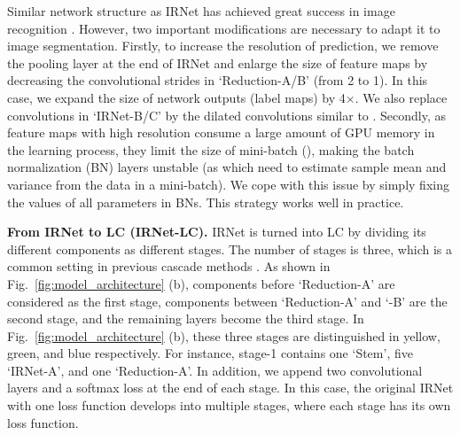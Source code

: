 \documentclass[10pt,twocolumn,letterpaper]{article}
\begin{document}
Similar network structure as IRNet has achieved great success in image recognition \cite{szegedy2016inception}.
However, two important modifications are necessary to adapt it to image segmentation.
Firstly, to increase the resolution of prediction, we remove the pooling layer at the end of IRNet and enlarge the size of feature maps by decreasing the convolutional strides in `Reduction-A/B' (from 2 to 1).
In this case, we expand the size of network outputs (label maps) by 4$\times$.
We also replace convolutions in `IRNet-B/C' by the dilated convolutions similar to \cite{chen2014semantic}.
Secondly, as feature maps with high resolution consume a large amount of GPU memory in the learning process, they limit the size of mini-batch (), making the batch normalization (BN) layers \cite{ioffe2015batch} unstable (as which need to estimate sample mean and variance from the data in a mini-batch).
We cope with this issue by simply fixing the values of all parameters in BNs.
This strategy works well in practice.









\noindent
\textbf{From IRNet to LC (IRNet-LC).}
IRNet is turned into LC by dividing its different components as different stages.
The number of stages is three, which is a common setting in previous cascade methods \cite{li2015convolutional, sun2013deep, toshev2014deeppose}.
As shown in Fig.~\ref{fig:model_architecture} (b), components before `Reduction-A' are considered as the first stage, components between `Reduction-A' and `-B' are the second stage, and the remaining layers become the third stage.
In Fig.~\ref{fig:model_architecture} (b), these three stages are distinguished in yellow, green, and blue respectively.
For instance, stage-1 contains one `Stem', five `IRNet-A', and one `Reduction-A'.
In addition, we append two convolutional layers and a softmax loss at the end of each stage.
In this case, the original IRNet with one loss function develops into multiple stages, where each stage has its own loss function.
\end{document}
